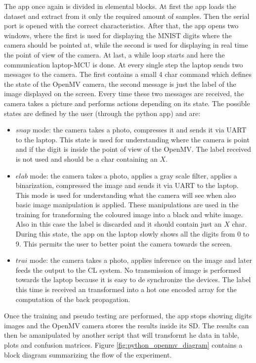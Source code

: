\documentclass[12pt]{report}
\begin{document}
The app once again is divided in elemental blocks. At first the app loads the dataset and extract from it only the required amount of samples. Then the serial port is opened with the correct characteristics. After that, the app opens two windows, where the first is used for displaying the MNIST digits where the camera should be pointed at, while the second is used for displaying in real time the point of view of the camera. At last, a while loop starts and here the communication laptop-MCU is done. At every single step the laptop sends two messages to the camera. The first contains a small 4 char command which defines the state of the OpenMV camera, the second message is just the label of the image displayed on the screen. Every time these two messages are received, the camera takes a picture and performs actions depending on its state. The possible states are defined by the user (through the python app) and are: 

\begin{itemize}
	\item $snap$ mode: the camera takes a photo, compresses it and sends it via UART to the laptop. This state is used for understanding where the camera is point and if the digit is inside the point of view of the OpenMV. The label received is not used and should be a char containing an $X$.
	\item $elab$ mode: the camera takes a photo, applies a gray scale filter, applies a binarization, compressed the image and sends it via UART to the laptop. This mode is used for understanding what the camera will see  when also basic image manipulation is applied. These manipulations are used in the training for transforming the coloured image into a black and white image. Also in this case the label is discarded and it should contain just an $X$ char. During this state, the app on the laptop slowly shows all the digits from 0 to 9. This permits the user to better point the camera towards the screen.
	\item $trai$ mode: the camera takes a photo, applies inference on the image and later feeds the output to the CL system. No transmission of image is performed towards the laptop because it is easy to de synchronize the devices. The label this time is received an transformed into a hot one encoded array for the computation of the back propagation.
\end{itemize}

Once the training and pseudo testing are performed, the app stops showing digits images and the OpenMV camera stores the results inside its SD. The results can then be amanipulated by another script that will transformt he data in table, plots and confusion matrices. Figure \ref{fig:python_openmv_diagram} contains a block diagram summarizing the flow of the experiment. 
\end{document}
